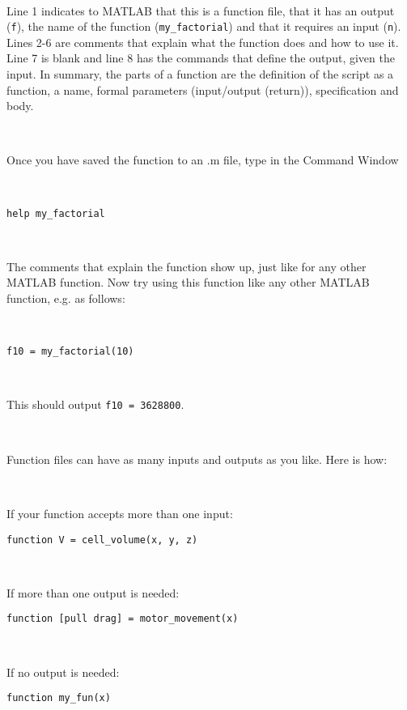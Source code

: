 \documentclass[11pt]{amsart}
\begin{document}
\


Line 1 indicates to MATLAB that this is a function file, that it has an output (\verb+f+), the name of the function (\verb+my_factorial+) and that it requires an input (\verb+n+). Lines 2-6 are comments that explain what the function does and how to use it. Line 7 is blank and line 8 has the commands that define the output, given the input. In summary, the parts of a function are the definition of the script as a function, a name, formal parameters (input/output (return)), specification and body.

\

Once you have saved the function to an .m file, type in the Command Window

\

\color{blue}
\begin{verbatim}
help my_factorial
\end{verbatim}
\color{black}

\

The comments that explain the function show up, just like for any other MATLAB function. Now try using this function like any other MATLAB function, e.g. as follows:

\

\color{blue}
\begin{verbatim}
f10 = my_factorial(10)
\end{verbatim}
\color{black}

\

This should output \verb+f10 = 3628800+.

\

Function files can have as many inputs and outputs as you like. Here is how:

\
 
If your function accepts more than one input: 
\color{blue}
\begin{verbatim}
function V = cell_volume(x, y, z) 
\end{verbatim}
\color{black}

\

 
If more than one output is needed: 
\color{blue}
\begin{verbatim}
function [pull drag] = motor_movement(x)
 \end{verbatim}
\color{black}

\

If no output is needed: 
\color{blue}
\begin{verbatim}
function my_fun(x) 
\end{verbatim}
\color{black}
\end{document}

